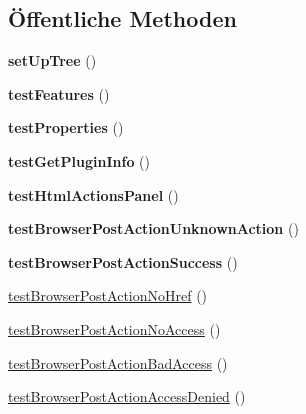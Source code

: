 \subsection*{Öffentliche Methoden}
\begin{DoxyCompactItemize}
\item 
\mbox{\label{class_sabre_1_1_d_a_v_1_1_sharing_1_1_plugin_test_a642adee1e5b977924427a9796c2d489b}} 
{\bfseries set\+Up\+Tree} ()
\item 
\mbox{\label{class_sabre_1_1_d_a_v_1_1_sharing_1_1_plugin_test_ab89e0cb1b2c1e48959992f4d6e9334d3}} 
{\bfseries test\+Features} ()
\item 
\mbox{\label{class_sabre_1_1_d_a_v_1_1_sharing_1_1_plugin_test_a96b1615df72cd97088a5662a3be703c2}} 
{\bfseries test\+Properties} ()
\item 
\mbox{\label{class_sabre_1_1_d_a_v_1_1_sharing_1_1_plugin_test_aadb38e68ff291d9e28b0877c9c81beb5}} 
{\bfseries test\+Get\+Plugin\+Info} ()
\item 
\mbox{\label{class_sabre_1_1_d_a_v_1_1_sharing_1_1_plugin_test_a5a8067f4723cf87ab1c010be5171cd40}} 
{\bfseries test\+Html\+Actions\+Panel} ()
\item 
\mbox{\label{class_sabre_1_1_d_a_v_1_1_sharing_1_1_plugin_test_a91e2eb35ce5bc0d7deb0834f797ece0f}} 
{\bfseries test\+Browser\+Post\+Action\+Unknown\+Action} ()
\item 
\mbox{\label{class_sabre_1_1_d_a_v_1_1_sharing_1_1_plugin_test_af514098d81eb5fb7e265e97b703fa22c}} 
{\bfseries test\+Browser\+Post\+Action\+Success} ()
\item 
\mbox{\hyperlink{class_sabre_1_1_d_a_v_1_1_sharing_1_1_plugin_test_a508ace1a26577d907ced259eb6f4a227}{test\+Browser\+Post\+Action\+No\+Href}} ()
\item 
\mbox{\hyperlink{class_sabre_1_1_d_a_v_1_1_sharing_1_1_plugin_test_a133113dfc97040d9c7dd551fe8f21b34}{test\+Browser\+Post\+Action\+No\+Access}} ()
\item 
\mbox{\hyperlink{class_sabre_1_1_d_a_v_1_1_sharing_1_1_plugin_test_abfe495ff6e3f7d7e3947e388d66bbdec}{test\+Browser\+Post\+Action\+Bad\+Access}} ()
\item 
\mbox{\hyperlink{class_sabre_1_1_d_a_v_1_1_sharing_1_1_plugin_test_a2db99e9375f88c6b1d479b46e9592b89}{test\+Browser\+Post\+Action\+Access\+Denied}} ()
\end{DoxyCompactItemize}

